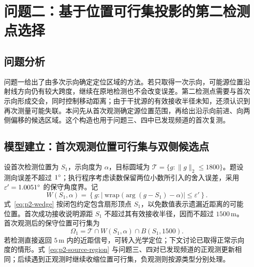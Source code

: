 \section{问题二：基于位置可行集投影的第二检测点选择}

\subsection{问题分析}

问题一给出了由多次示向确定定位区域的方法。若只取得一次示向，可能源位置沿射线方向仍有较大跨度，继续在原地检测也不会改变误差。第二检测点需要与首次示向形成交会，同时控制移动距离；由于干扰源的有效接收半径未知，还须认识到再次测量可能失联。本问先从首次观测确定源位置范围，再给出沿示向前进、向两侧偏移的候选区域。这个构造也用于问题三、四中已发现频道的首次复测。

\subsection{模型建立：首次观测位置可行集与双侧候选点}

设首次检测位置为 \(S_1\)，示向度为 \(\alpha\)，目标圆域为 \(\mathcal T=\{g:\|g\|_2\le1800\}\)。题设测向误差不超过 \(1^{\circ}\)；执行程序考虑读数保留两位小数所引入的舍入误差，采用 \(\varepsilon'=1.0051^{\circ}\) 的保守角度界。记
\begin{equation}
  W(S_1,\alpha)=\left\{g:\left|\operatorname{wrap}
  \bigl(\arg(g-S_1)-\alpha\bigr)\right|\le\varepsilon'\right\}.
  \label{eq:p2-wedge}
\end{equation}
式~\eqref{eq:p2-wedge} 按闭包约定包含扇形顶点 \(S_1\)，以免数值表示遗漏近距离的可能位置。首次成功接收说明源距 \(S_1\) 不超过其有效接收半径，因而不超过 \(1500\,\mathrm{m}\)。首次观测后的保守位置可行集为
\begin{equation}
  \Omega_1=\mathcal T\cap W(S_1,\alpha)\cap B(S_1,1500).
  \label{eq:p2-source-region}
\end{equation}
若检测直接返回 \(5\,\mathrm{m}\) 内的近距信号，可转入光学定位；下文讨论已取得正常示向度的情形。式~\eqref{eq:p2-source-region} 与问题三、四对已发现频道的正观测更新相同；后续遇到正观测时继续收缩位置可行集，负观测则按源类型分别处理。

